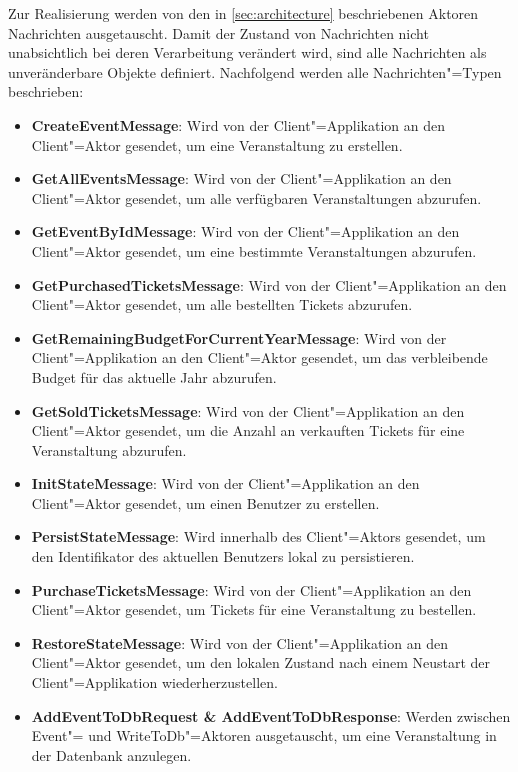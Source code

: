 Zur Realisierung werden von den in \autoref{sec:architecture} beschriebenen Aktoren Nachrichten ausgetauscht.
Damit der Zustand von Nachrichten nicht unabsichtlich bei deren Verarbeitung verändert wird, sind alle Nachrichten als unveränderbare Objekte definiert.
Nachfolgend werden alle Nachrichten"=Typen beschrieben:

\begin{itemize}[itemsep=-.5em,leftmargin=*]
    \item \textbf{CreateEventMessage}: Wird von der Client"=Applikation an den Client"=Aktor gesendet, um eine Veranstaltung zu erstellen.
    \item \textbf{GetAllEventsMessage}: Wird von der Client"=Applikation an den Client"=Aktor gesendet, um alle verfügbaren Veranstaltungen abzurufen.
    \item \textbf{GetEventByIdMessage}: Wird von der Client"=Applikation an den Client"=Aktor gesendet, um eine bestimmte Veranstaltungen abzurufen.
    \item \textbf{GetPurchasedTicketsMessage}: Wird von der Client"=Applikation an den Client"=Aktor gesendet, um alle bestellten Tickets abzurufen.
    \item \textbf{GetRemainingBudgetForCurrentYearMessage}: Wird von der Client"=Applikation an den Client"=Aktor gesendet, um das verbleibende Budget für das aktuelle Jahr abzurufen.
    \item \textbf{GetSoldTicketsMessage}: Wird von der Client"=Applikation an den Client"=Aktor gesendet, um die Anzahl an verkauften Tickets für eine Veranstaltung abzurufen.
    \item \textbf{InitStateMessage}: Wird von der Client"=Applikation an den Client"=Aktor gesendet, um einen Benutzer zu erstellen.
    \item \textbf{PersistStateMessage}: Wird innerhalb des Client"=Aktors gesendet, um den Identifikator des aktuellen Benutzers lokal zu persistieren.
    \item \textbf{PurchaseTicketsMessage}: Wird von der Client"=Applikation an den Client"=Aktor gesendet, um Tickets für eine Veranstaltung zu bestellen.
    \item \textbf{RestoreStateMessage}: Wird von der Client"=Applikation an den Client"=Aktor gesendet, um den lokalen Zustand nach einem Neustart der Client"=Applikation wiederherzustellen.
    \item \textbf{AddEventToDbRequest \& AddEventToDbResponse}: Werden zwischen Event"= und WriteToDb"=Aktoren ausgetauscht, um eine Veranstaltung in der Datenbank anzulegen.

\end{itemize}

